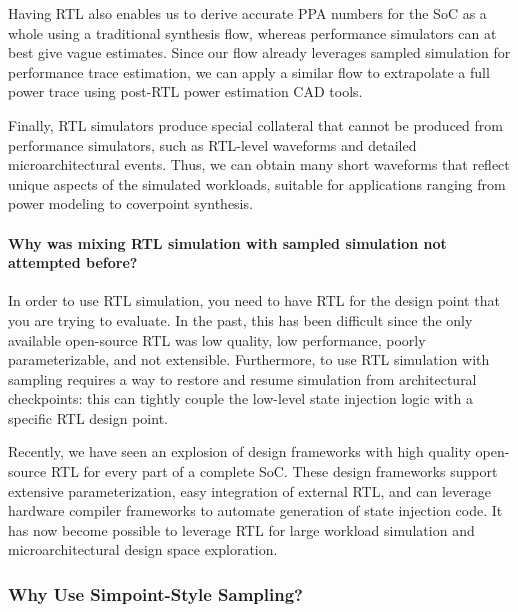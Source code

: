 \documentclass[sigplan,nonacm,10pt]{acmart}
\begin{document}
Having RTL also enables us to derive accurate PPA numbers for the SoC as a whole using a traditional synthesis flow, whereas performance simulators can at best give vague estimates.
Since our flow already leverages sampled simulation for performance trace estimation, we can apply a similar flow to extrapolate a full power trace using post-RTL power estimation CAD tools.

Finally, RTL simulators produce special collateral that cannot be produced from performance simulators, such as RTL-level waveforms and detailed microarchitectural events.
Thus, we can obtain many short waveforms that reflect unique aspects of the simulated workloads, suitable for applications ranging from power modeling to coverpoint synthesis.

\paragraph{Why was mixing RTL simulation with sampled simulation not attempted before?}


In order to use RTL simulation, you need to have RTL for the design point that you are trying to evaluate.
In the past, this has been difficult since the only available open-source RTL was low quality, low performance, poorly parameterizable, and not extensible.
Furthermore, to use RTL simulation with sampling requires a way to restore and resume simulation from architectural checkpoints: this can tightly couple the low-level state injection logic with a specific RTL design point.

Recently, we have seen an explosion of design frameworks with high quality open-source RTL for every part of a complete SoC\cite{chipyard, open_esp, openpiton, xiangshan, pulpv2, blackparrot}.
These design frameworks support extensive parameterization, easy integration of external RTL, and can leverage hardware compiler frameworks\cite{firrtl} to automate generation of state injection code.
It has now become possible to leverage RTL for large workload simulation and microarchitectural design space exploration.

\subsubsection{Why Use Simpoint-Style Sampling?}
\end{document}
